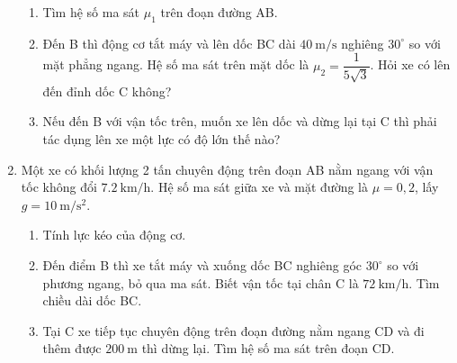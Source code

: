 \begin{enumerate}
	\begin{enumerate}[label=\alph*)]
		\item Tìm hệ số ma sát $\mu_1$ trên đoạn đường AB.
		\item Đến B thì động cơ tắt máy và lên dốc BC dài $\SI{40}{\meter/\second}$ nghiêng $30^\circ$ so với mặt phẳng ngang. Hệ số ma sát trên mặt dốc là $\mu_2=\dfrac{1}{5\sqrt{3}}$. Hỏi xe có lên đến đỉnh dốc C không?
		\item Nếu đến B với vận tốc trên, muốn xe lên dốc và dừng lại tại C thì phải tác dụng lên xe một lực có độ lớn thế nào?
	\end{enumerate}
	\item %
	Một xe có khối lượng 2 tấn chuyên động trên đoạn AB nằm ngang với vận tốc không đổi $\SI{7,2}{\kilo\meter/\hour}$. Hệ số ma sát giữa xe và mặt đường là $\mu=0,2$, lấy $g= \SI{10}{\meter/\second^2}$.
	\begin{enumerate}[label=\alph*)]
		\item Tính lực kéo của động cơ.
		\item Đến điểm B thì xe tắt máy và xuống dốc BC nghiêng góc $30^\circ$ so với phương ngang, bỏ qua ma sát. Biết vận tốc tại chân C là $\SI{72}{\kilo\meter/\hour}$. Tìm chiều dài dốc BC.
		\item Tại C xe tiếp tục chuyên động trên đoạn đường nằm ngang CD và đi thêm được $\SI{200}{\meter}$ thì dừng lại. Tìm hệ số ma sát trên đoạn CD.
	\end{enumerate}
\end{enumerate}

